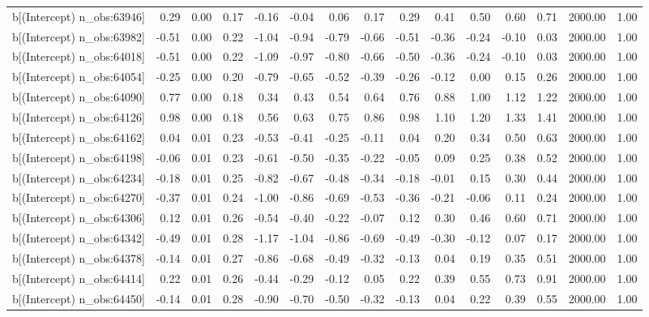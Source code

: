 \begin{table}[ht]
\begin{tabular}{rrrrrrrrrrrrrrr}
  b[(Intercept) n\_obs:63946] & 0.29 & 0.00 & 0.17 & -0.16 & -0.04 & 0.06 & 0.17 & 0.29 & 0.41 & 0.50 & 0.60 & 0.71 & 2000.00 & 1.00 \\ 
  b[(Intercept) n\_obs:63982] & -0.51 & 0.00 & 0.22 & -1.04 & -0.94 & -0.79 & -0.66 & -0.51 & -0.36 & -0.24 & -0.10 & 0.03 & 2000.00 & 1.00 \\ 
  b[(Intercept) n\_obs:64018] & -0.51 & 0.00 & 0.22 & -1.09 & -0.97 & -0.80 & -0.66 & -0.50 & -0.36 & -0.24 & -0.10 & 0.03 & 2000.00 & 1.00 \\ 
  b[(Intercept) n\_obs:64054] & -0.25 & 0.00 & 0.20 & -0.79 & -0.65 & -0.52 & -0.39 & -0.26 & -0.12 & 0.00 & 0.15 & 0.26 & 2000.00 & 1.00 \\ 
  b[(Intercept) n\_obs:64090] & 0.77 & 0.00 & 0.18 & 0.34 & 0.43 & 0.54 & 0.64 & 0.76 & 0.88 & 1.00 & 1.12 & 1.22 & 2000.00 & 1.00 \\ 
  b[(Intercept) n\_obs:64126] & 0.98 & 0.00 & 0.18 & 0.56 & 0.63 & 0.75 & 0.86 & 0.98 & 1.10 & 1.20 & 1.33 & 1.41 & 2000.00 & 1.00 \\ 
  b[(Intercept) n\_obs:64162] & 0.04 & 0.01 & 0.23 & -0.53 & -0.41 & -0.25 & -0.11 & 0.04 & 0.20 & 0.34 & 0.50 & 0.63 & 2000.00 & 1.00 \\ 
  b[(Intercept) n\_obs:64198] & -0.06 & 0.01 & 0.23 & -0.61 & -0.50 & -0.35 & -0.22 & -0.05 & 0.09 & 0.25 & 0.38 & 0.52 & 2000.00 & 1.00 \\ 
  b[(Intercept) n\_obs:64234] & -0.18 & 0.01 & 0.25 & -0.82 & -0.67 & -0.48 & -0.34 & -0.18 & -0.01 & 0.15 & 0.30 & 0.44 & 2000.00 & 1.00 \\ 
  b[(Intercept) n\_obs:64270] & -0.37 & 0.01 & 0.24 & -1.00 & -0.86 & -0.69 & -0.53 & -0.36 & -0.21 & -0.06 & 0.11 & 0.24 & 2000.00 & 1.00 \\ 
  b[(Intercept) n\_obs:64306] & 0.12 & 0.01 & 0.26 & -0.54 & -0.40 & -0.22 & -0.07 & 0.12 & 0.30 & 0.46 & 0.60 & 0.71 & 2000.00 & 1.00 \\ 
  b[(Intercept) n\_obs:64342] & -0.49 & 0.01 & 0.28 & -1.17 & -1.04 & -0.86 & -0.69 & -0.49 & -0.30 & -0.12 & 0.07 & 0.17 & 2000.00 & 1.00 \\ 
  b[(Intercept) n\_obs:64378] & -0.14 & 0.01 & 0.27 & -0.86 & -0.68 & -0.49 & -0.32 & -0.13 & 0.04 & 0.19 & 0.35 & 0.51 & 2000.00 & 1.00 \\ 
  b[(Intercept) n\_obs:64414] & 0.22 & 0.01 & 0.26 & -0.44 & -0.29 & -0.12 & 0.05 & 0.22 & 0.39 & 0.55 & 0.73 & 0.91 & 2000.00 & 1.00 \\ 
  b[(Intercept) n\_obs:64450] & -0.14 & 0.01 & 0.28 & -0.90 & -0.70 & -0.50 & -0.32 & -0.13 & 0.04 & 0.22 & 0.39 & 0.55 & 2000.00 & 1.00 \\ 

\end{tabular}
\end{table}
